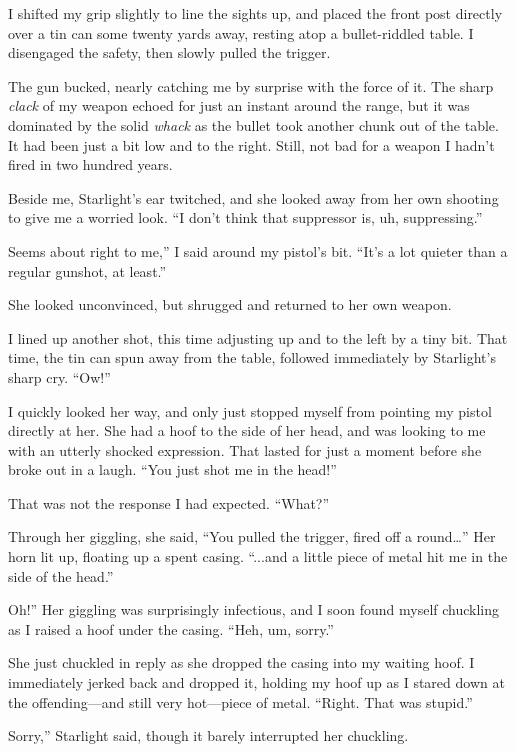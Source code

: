 I shifted my grip slightly to line the sights up, and placed the front post directly over a tin can some twenty yards away, resting atop a bullet-riddled table. I disengaged the safety, then slowly pulled the trigger.

The gun bucked, nearly catching me by surprise with the force of it. The sharp \textit{clack} of my weapon echoed for just an instant around the range, but it was dominated by the solid \textit{whack} as the bullet took another chunk out of the table. It had been just a bit low and to the right. Still, not bad for a weapon I hadn’t fired in two hundred years.

Beside me, Starlight’s ear twitched, and she looked away from her own shooting to give me a worried look. “I don’t think that suppressor is, uh, suppressing.”

\leavevmode{}Seems about right to me,” I said around my pistol’s bit. “It’s a lot quieter than a regular gunshot, at least.”

She looked unconvinced, but shrugged and returned to her own weapon.

I lined up another shot, this time adjusting up and to the left by a tiny bit. That time, the tin can spun away from the table, followed immediately by Starlight’s sharp cry. “Ow!”

I quickly looked her way, and only just stopped myself from pointing my pistol directly at her. She had a hoof to the side of her head, and was looking to me with an utterly shocked expression. That lasted for just a moment before she broke out in a laugh. “You just shot me in the head!”

That was not the response I had expected. “What?”

Through her giggling, she said, “You pulled the trigger, fired off a round…” Her horn lit up, floating up a spent casing. “...and a little piece of metal hit me in the side of the head.”

\leavevmode{}Oh!” Her giggling was surprisingly infectious, and I soon found myself chuckling as I raised a hoof under the casing. “Heh, um, sorry.”

She just chuckled in reply as she dropped the casing into my waiting hoof. I immediately jerked back and dropped it, holding my hoof up as I stared down at the offending—and still very hot—piece of metal. “Right. That was stupid.”

\leavevmode{}Sorry,” Starlight said, though it barely interrupted her chuckling.

